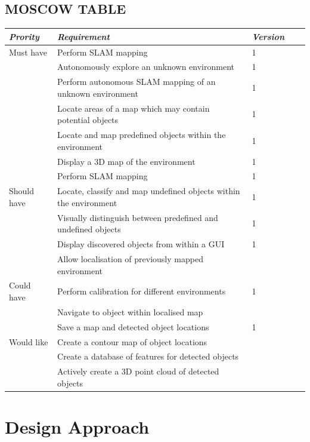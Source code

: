 \documentclass{mproj}
\begin{document}
 \subsection{MOSCOW TABLE}

\begin{tabular}{*5l}    \toprule
\emph{Prority} & \emph{Requirement} & \emph{Version} \\\midrule
\rowcolor{green!50} Must have & Perform SLAM mapping & 1\\
\rowcolor{green!50} & Autonomously explore an unknown environment & 1\\
\rowcolor{green!50} & Perform autonomous SLAM mapping of an unknown environment & 1\\
\rowcolor{green!50} & Locate areas of a map which may contain potential objects & 1\\
\rowcolor{green!50} & Locate and map predefined objects within the environment & 1\\
\rowcolor{green!50} & Display a 3D map of the environment & 1\\
\rowcolor{green!50} & Perform SLAM mapping & 1\\
\rowcolor{yellow!50} Should have & Locate, classify and map undefined objects within the environment & 1\\
\rowcolor{yellow!50} & Visually distinguish between predefined and undefined objects & 1\\
\rowcolor{yellow!50} & Display discovered objects from within a GUI & 1\\
\rowcolor{yellow!50} & Allow localisation of previously mapped environment  & \\
\rowcolor{orange!50} Could have & Perform calibration for different environments  & 1\\
\rowcolor{orange!50} & Navigate to object within localised map  & \\
\rowcolor{orange!50} & Save a map and detected object locations  & 1\\
\rowcolor{red!50} Would like & Create a contour map of object locations & \\
\rowcolor{red!50} & Create a database of features for detected objects & \\
\rowcolor{red!50} & Actively create a 3D point cloud of detected objects & \\

\bottomrule
 \hline
\end{tabular}


\section{Design Approach}
\end{document}

